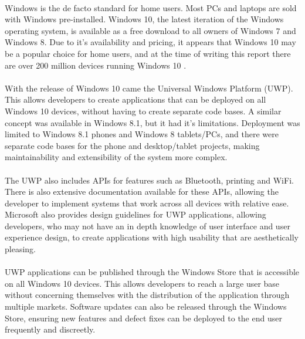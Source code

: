 		\paragraph{}{
		Windows is the de facto standard for home users. Most PCs and laptops are sold with Windows pre-installed. Windows 10, the latest iteration of the Windows operating system, is available as a free download to all owners of Windows 7 and Windows 8. Due to it's availability and pricing, it appears that Windows 10 may be a popular choice for home users, and at the time of writing this report there are over 200 million devices running Windows 10 \cite{Win10Nums}.
		}
		\paragraph{}{
		With the release of Windows 10 came the Universal Windows Platform (UWP). This allows developers to create applications that can be deployed on all Windows 10 devices, without having to create separate code bases. A similar concept was available in Windows 8.1, but it had it's limitations. Deployment was limited to Windows 8.1 phones and Windows 8 tablets/PCs, and there were separate code bases for the phone and desktop/tablet projects, making maintainability and extensibility of the system more complex.
		}
		\paragraph{}{
		The UWP also includes APIs for features such as Bluetooth, printing and WiFi. There is also extensive documentation available for these APIs, allowing the developer to implement systems that work across all devices with relative ease. Microsoft also provides design guidelines for UWP applications, allowing developers, who may not have an in depth knowledge of user interface and user experience design, to create applications with high usability that are aesthetically pleasing.
		}
		\paragraph{}{
		UWP applications can be published through the Windows Store that is accessible on all Windows 10 devices. This allows developers to reach a large user base without concerning themselves with the distribution of the application through multiple markets. Software updates can also be released through the Windows Store, ensuring new features and defect fixes can be deployed to the end user frequently and discreetly.
		}	
		
